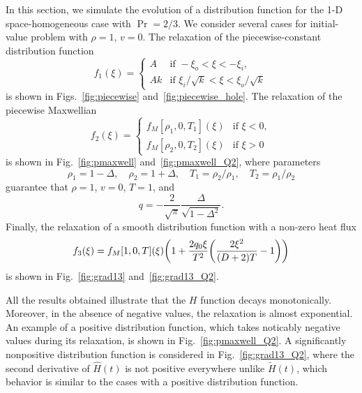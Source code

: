 \documentclass{article}
\begin{document}
In this section, we simulate the evolution of a distribution function
for the 1-D space-homogeneous case with $\Pr = 2/3$.
We consider several cases for initial-value problem with $\rho=1$, $v=0$.
The relaxation of the piecewise-constant distribution function
\begin{equation}\label{eq:piecewise}
    f_1(\xi) = \begin{cases}
        A &\text{if } -\xi_o < \xi < -\xi_i, \\
        Ak &\text{if } \xi_i/\sqrt{k} < \xi < \xi_o/\sqrt{k}
    \end{cases}
\end{equation}
is shown in Figs.~\ref{fig:piecewise} and~\ref{fig:piecewise_hole}.
The relaxation of the piecewise Maxwellian
\begin{equation}\label{eq:pmaxwell}
    f_2(\xi) = \begin{cases}
        f_M[\rho_1, 0, T_1](\xi) &\text{if } \xi < 0, \\
        f_M[\rho_2, 0, T_2](\xi) &\text{if } \xi > 0
    \end{cases}
\end{equation}
is shown in Fig.~\ref{fig:pmaxwell} and~\ref{fig:pmaxwell_Q2}, where parameters
\begin{equation}\label{eq:pmaxwell_params}
    \rho_1 = 1-\Delta, \quad \rho_2 = 1+\Delta, \quad T_1 = \rho_2/\rho_1, \quad T_2 = \rho_1/\rho_2
\end{equation}
guarantee that $\rho=1$, $v=0$, $T=1$, and
\begin{equation}\label{eq:pmaxwell_q}
    q = -\frac2{\sqrt\pi}\frac{\Delta}{\sqrt{1-\Delta^2}}.
\end{equation}
Finally, the relaxation of a smooth distribution function with a non-zero heat flux
\begin{equation}\label{eq:grad13}
    f_3(\xi) = f_M[1, 0, T](\xi)\qty(1 + \frac{2q_0\xi}{T^2}\qty(\frac{2\xi^2}{(D+2)T} - 1))
\end{equation}
is shown in Fig.~\ref{fig:grad13} and~\ref{fig:grad13_Q2}.

All the results obtained illustrate that the $H$ function decays monotonically.
Moreover, in the absence of negative values, the relaxation is almost exponential.
An example of a positive distribution function,
which takes noticably negative values during its relaxation, is shown in Fig.~\ref{fig:pmaxwell_Q2}.
A significantly nonpositive distribution function is considered in Fig.~\ref{fig:grad13_Q2},
where the second derivative of $\hat{H}(t)$ is not positive everywhere unlike $\tilde{H}(t)$,
which behavior is similar to the cases with a positive distribution function.
\end{document}
